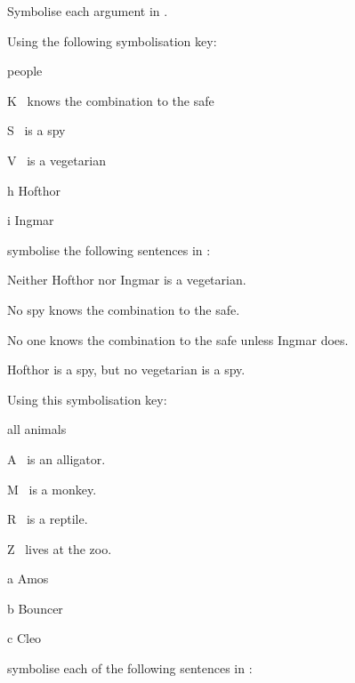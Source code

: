 Symbolise each argument in \FOL.



\problempart
\label{pr.FOLvegetarians}
Using the following symbolisation key:
\begin{ekey}
\item[\domain] people
\item[K] \blank\ knows the combination to the safe
\item[S] \blank\ is a spy
\item[V] \blank\ is a vegetarian
\item[h] Hofthor
\item[i] Ingmar
\end{ekey}
symbolise the following sentences in \FOL:
\begin{earg}
\item Neither Hofthor nor Ingmar is a vegetarian.
\item No spy knows the combination to the safe.
\item No one knows the combination to the safe unless Ingmar does.
\item Hofthor is a spy, but no vegetarian is a spy.
\end{earg}
\problempart\label{pr.FOLalligators}
Using this symbolisation key:
\begin{ekey}
\item[\domain] all animals
\item[A] \blank\ is an alligator.
\item[M] \blank\ is a monkey.
\item[R] \blank\ is a reptile.
\item[Z] \blank\ lives at the zoo.
\item[a] Amos
\item[b] Bouncer
\item[c] Cleo
\end{ekey}
symbolise each of the following sentences in \FOL:
